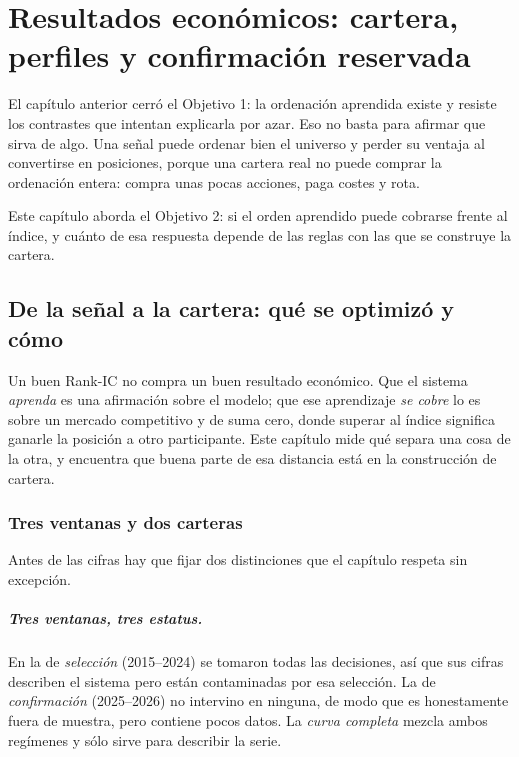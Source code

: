 \chapter{Resultados económicos: cartera, perfiles y confirmación reservada}
\label{chap:resultados-economicos}

El capítulo anterior cerró el Objetivo 1: la ordenación aprendida existe y resiste los contrastes que
intentan explicarla por azar. Eso no basta para afirmar que sirva de algo. Una señal puede ordenar
bien el universo y perder su ventaja al convertirse en posiciones, porque una cartera real no puede
comprar la ordenación entera: compra unas pocas acciones, paga costes y rota.

Este capítulo aborda el Objetivo 2: si el orden aprendido puede cobrarse frente al índice, y
cuánto de esa respuesta depende de las reglas con las que se construye la cartera.

\section{De la señal a la cartera: qué se optimizó y cómo}
\label{sec:cartera-rejilla}

Un buen Rank-IC no compra un buen resultado económico. Que el sistema \emph{aprenda} es una
afirmación sobre el modelo; que ese aprendizaje \emph{se cobre} lo es sobre un mercado competitivo y
de suma cero, donde superar al índice significa ganarle la posición a otro participante. Este
capítulo mide qué separa una cosa de la otra, y encuentra que buena parte de esa distancia está en
la construcción de cartera.

\subsection{Tres ventanas y dos carteras}

Antes de las cifras hay que fijar dos distinciones que el capítulo respeta sin excepción.

\paragraph{Tres ventanas, tres estatus.} En la de \emph{selección} (2015--2024) se tomaron todas las
decisiones, así que sus cifras describen el sistema pero están contaminadas por esa selección. La de
\emph{confirmación} (2025--2026) no intervino en ninguna, de modo que es honestamente fuera de
muestra, pero contiene pocos datos. La \emph{curva completa} mezcla ambos regímenes y sólo sirve
para describir la serie.


